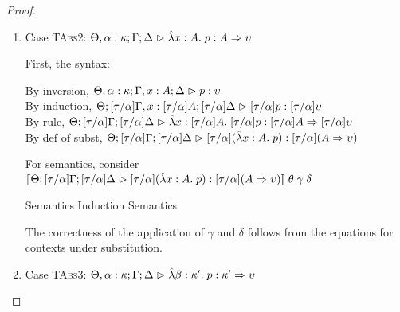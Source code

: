 \begin{proof}
\begin{enumerate}
\item Case \textsc{TAbs2}: $\judgeA[\Theta, \alpha:\kappa; \Gamma; \Delta]{\pfun{x}{A}{p}}{A \To \upsilon}$
  
  First, the syntax:
  \begin{tabbedproof}
    \oo By inversion, $\judgeA[\Theta, \alpha:\kappa; \Gamma, x:A; \Delta]{p}{\upsilon}$ \\
    \oo By induction, $\judgeA[\Theta; {[\tau/\alpha]}\Gamma, x:{[\tau/\alpha]}A; {[\tau/\alpha]}\Delta]{{[\tau/\alpha]}p}{{[\tau/\alpha]}\upsilon}$ \\
    \oo By rule, $\judgeA[\Theta; {[\tau/\alpha]}\Gamma; {[\tau/\alpha]}\Delta]{\pfun{x}{{[\tau/\alpha]}A}{{[\tau/\alpha]}p}}{{[\tau/\alpha]}A \To {[\tau/\alpha]}\upsilon}$ \\
    \oo By def of subst, $\judgeA[\Theta; {[\tau/\alpha]}\Gamma; {[\tau/\alpha]}\Delta]{{[\tau/\alpha]}(\pfun{x}{A}{p})}{{[\tau/\alpha]}(A \To \upsilon)}$ \\
  \end{tabbedproof}
  For semantics, consider $\interp{\judgeA[\Theta; {[\tau/\alpha]}\Gamma; {[\tau/\alpha]}\Delta]{{[\tau/\alpha]}(\pfun{x}{A}{p})}{{[\tau/\alpha]}(A \To \upsilon)}}\;\theta\;\gamma\;\delta$ \\
  \begin{eqnproof}
          {Semantics}
          {Induction}
          {Semantics}
  \end{eqnproof}
  The correctness of the application of $\gamma$ and $\delta$ follows from the equations for contexts
  under substitution. 

\item Case \textsc{TAbs3}: $\judgeA[\Theta, \alpha:\kappa; \Gamma; \Delta]{\pfun{\beta}{\kappa'}{p}}{\kappa' \To \upsilon}$
  

\end{enumerate}
\end{proof}
